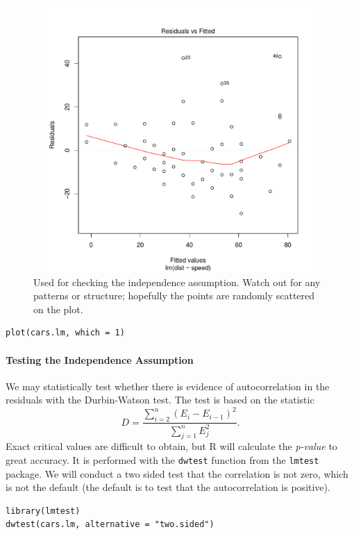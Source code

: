 \documentclass[captions=tableheading]{scrbook}
\begin{document}
\begin{figure}[th]
  \includegraphics[width=5in, height=4in]{img/resids-fitted-cars.pdf}
  \caption[Plot of the residuals versus the fitted values for the \texttt{cars}
data]{\small Used for checking the independence assumption. Watch out for any patterns or structure; hopefully the points are randomly scattered on the plot.}
  \label{fig:resids-fitted-cars}
\end{figure}


\begin{verbatim}
plot(cars.lm, which = 1)
\end{verbatim}

\paragraph*{Testing the Independence Assumption}

We may statistically test whether there is evidence of autocorrelation in the residuals with the Durbin-Watson test. The test is based on the statistic
\begin{equation}
D=\frac{\sum_{i=2}^{n}(E_{i}-E_{i-1})^{2}}{\sum_{j=1}^{n}E_{j}^{2}}.
\end{equation}
Exact critical values are difficult to obtain, but \textsf{R} will calculate the \emph{p-value} to great accuracy. It is performed with the \texttt{dwtest} function from the \texttt{lmtest} package. We will conduct a two sided test that the correlation is not zero, which is not the default (the default is to test that the autocorrelation is positive).


\begin{verbatim}
library(lmtest)
dwtest(cars.lm, alternative = "two.sided")
\end{verbatim}
\end{document}
